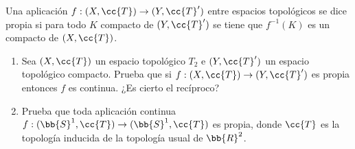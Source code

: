 \documentclass[12pt]{article}
\begin{document}
    \begin{ejercicio}
        Una aplicación $f : (X, \cc{T}) \to (Y, \cc{T}')$ entre espacios topológicos se dice propia si para todo $K$ compacto de $(Y, \cc{T}')$ se tiene que $f^{-1}(K)$ es un compacto de $(X, \cc{T})$.
        \begin{enumerate}[label=\alph*)]
            \item Sea $(X, \cc{T})$ un espacio topológico $T_2$ e $(Y, \cc{T}')$ un espacio topológico compacto. Prueba que si $f : (X, \cc{T}) \to (Y, \cc{T}')$ es propia entonces $f$ es continua. ¿Es cierto el recíproco?
            \item Prueba que toda aplicación continua $f : (\bb{S}^1, \cc{T}) \to (\bb{S}^1, \cc{T})$ es propia, donde $\cc{T}$ es la topología inducida de la topología usual de $\bb{R}^2$.
        \end{enumerate}
    \end{ejercicio}

    \newpage
    \setcounter{ejercicio}{0} %
\end{document}
